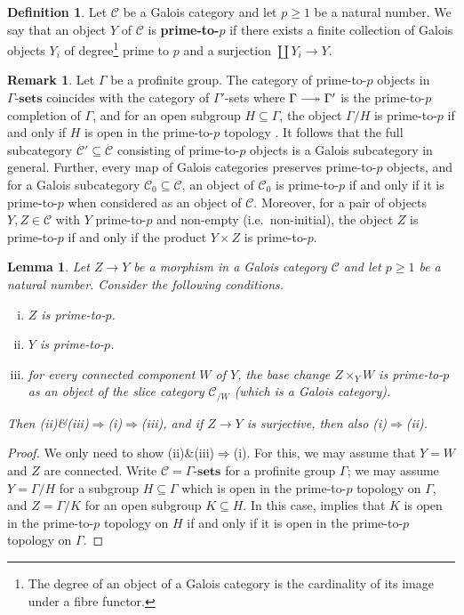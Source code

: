 \documentclass[a4paper,twoside,11pt,reqno]{amsart}
\newcommand{\cC}{{\mathcal C}}
\DeclareRobustCommand\longtwoheadrightarrow {\relbar\joinrel\twoheadrightarrow}
\newcommand{\surj}{\longtwoheadrightarrow}
\newcommand{\cat}[1]{\mathbf{#1}}
\newcommand{\Gsets}[1]{{#1\text{-}\sets}}   %
\newcommand{\sets}{\cat{sets}} %
\newtheorem{lem}[thm]{Lemma}
\theoremstyle{definition}
\newtheorem{defi}[thm]{Definition}
\newtheorem{rmk}[thm]{Remark}
\numberwithin{equation}{subsection}
\begin{document}
\begin{defi} \label{def:prime-to-p-obj}
    Let $\cC$ be a Galois category and let $p\geq 1$ be a natural number. We say that an object $Y$ of $\cC$ is {\bf prime-to-$p$} if there exists a finite collection of Galois objects $Y_i$ of degree\footnote{The degree of an object of a Galois category is the cardinality of its image under a fibre functor.} prime to $p$ and a surjection $\coprod Y_i\to Y$. 
\end{defi}

\begin{rmk} \label{rmk:prime-to-p-obj}
    Let $\Gamma$ be a profinite group. The category of prime-to-$p$ objects in $\Gsets{\Gamma}$ coincides with the category of $\Gamma'$-sets where $\Gamma \surj \Gamma'$ is the prime-to-$p$ completion of $\Gamma$, and for an open subgroup $H\subseteq \Gamma$, the object $\Gamma/H$ is prime-to-$p$ if and only if $H$ is open in the prime-to-$p$ topology \cite[\S 3.1]{RibesZalesskii}. It follows that the full subcategory $\cC'\subseteq\cC$ consisting of prime-to-$p$ objects is a Galois subcategory in general. Further, every map of Galois categories preserves prime-to-$p$ objects, and for a Galois subcategory $\cC_0\subseteq \cC$, an object of $\cC_0$ is prime-to-$p$ if and only if it is prime-to-$p$ when considered as an object of $\cC$. Moreover, for a pair of objects $Y,Z\in\cC$ with $Y$ prime-to-$p$ and non-empty (i.e.\ non-initial), the object $Z$ is prime-to-$p$ if and only if the product $Y\times Z$ is prime-to-$p$.
\end{rmk}

\begin{lem} \label{lem:wreath}
    Let $Z\to Y$ be a morphism in a Galois category $\cC$ and let $p\geq 1$ be a natural number. Consider the following conditions.
    \begin{enumerate}[(i)]
        \item $Z$ is prime-to-$p$.
        \item $Y$ is prime-to-$p$.
        \item for every connected component $W$ of $Y$, the base change $Z\times_Y W$ is prime-to-$p$ as an object of the slice category $\cC_{/W}$ (which is a Galois category).
    \end{enumerate}
    Then (ii)\&(iii)$\Rightarrow$(i)$\Rightarrow$(iii), and if $Z\to Y$ is surjective, then also (i)$\Rightarrow$(ii).
\end{lem}

\begin{proof}
We only need to show (ii)\&(iii)$\Rightarrow$(i). For this, we may assume that $Y=W$ and $Z$ are connected. Write $\cC = \Gsets{\Gamma}$ for a profinite group $\Gamma$; we may assume $Y=\Gamma/H$ for a subgroup $H\subseteq \Gamma$ which is open in the prime-to-$p$ topology on $\Gamma$, and $Z = \Gamma/K$ for an open subgroup $K\subseteq H$. In this case, \cite[Lemma~3.1.4]{RibesZalesskii} implies that $K$ is open in the prime-to-$p$ topology on $H$ if and only if it is open in the prime-to-$p$ topology on $\Gamma$.
\end{proof}
\end{document}
